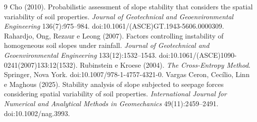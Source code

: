 \documentclass[11pt,a4paper]{article}
\begin{document}
\begin{thebibliography}{9}\small\setlength{\itemsep}{0pt}
 Cho (2010). Probabilistic assessment of slope stability that considers the spatial variability of
soil properties. \emph{Journal of Geotechnical and Geoenvironmental Engineering} 136(7):975--984.
doi:10.1061/(ASCE)GT.1943-5606.0000309.
 Rahardjo, Ong, Rezaur e Leong (2007). Factors controlling instability of homogeneous soil slopes
under rainfall. \emph{Journal of Geotechnical and Geoenvironmental Engineering} 133(12):1532--1543.
doi:10.1061/(ASCE)1090-0241(2007)133:12(1532).
 Rubinstein e Kroese (2004). \emph{The Cross-Entropy Method}. Springer, Nova York.
doi:10.1007/978-1-4757-4321-0.
 Vargas Ceron, Cecílio, Linn e Maghous (2025). Stability analysis of slope subjected to seepage forces
considering spatial variability of soil properties. \emph{International Journal for Numerical and Analytical Methods in
Geomechanics} 49(11):2459--2491. doi:10.1002/nag.3993.
\end{thebibliography}
\end{document}
